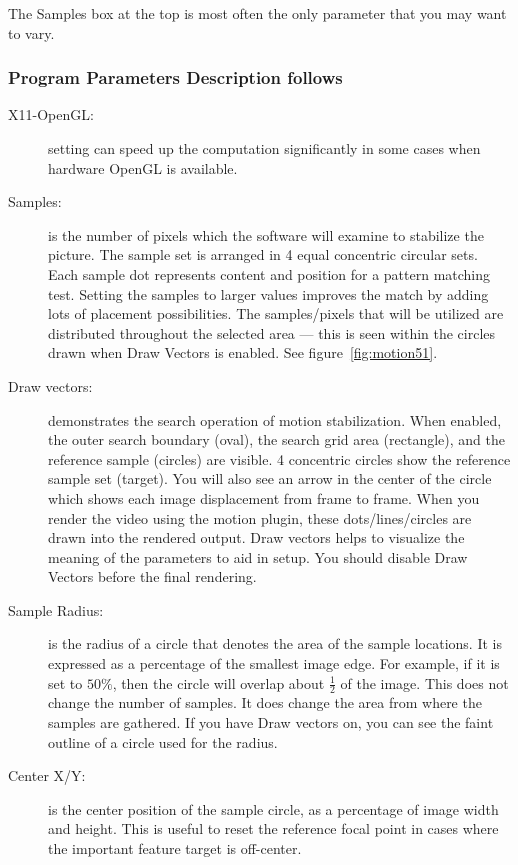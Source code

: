 The Samples box at the top is most often the only parameter that you may want to vary.

\subsubsection*{Program Parameters Description follows}
\label{ssub:program_parameters_description}

\begin{description}
    \item[X11-OpenGL:] setting can speed up the computation significantly in some cases when hardware OpenGL is available.
    \item[Samples:] is the number of pixels which the software will examine to stabilize the picture. The sample set is arranged in 4 equal concentric circular sets. Each sample dot represents content and position for a pattern matching test. Setting the samples to larger values improves the match by adding lots of placement possibilities. The samples/pixels that will be utilized are distributed throughout the selected area --- this is seen within the circles drawn when Draw Vectors is enabled. See figure~\ref{fig:motion51}.
    \item[Draw vectors:] demonstrates the search operation of motion stabilization. When enabled, the outer search boundary (oval), the search grid area (rectangle), and the reference sample (circles) are visible. 4 concentric circles show the reference sample set (target). You will also see an arrow in the center of the circle which shows each image displacement from frame to frame. When you render the video using the motion plugin, these dots/lines/circles are drawn into the rendered output. Draw vectors helps to visualize the meaning of the parameters to aid in setup. You should disable Draw Vectors before the final rendering.
    \item[Sample Radius:] is the radius of a circle that denotes the area of the sample locations. It is expressed as a percentage of the smallest image edge. For example, if it is set to $50\%$, then the circle will overlap about $\frac{1}{2}$ of the image. This does not change the number of samples. It does change the area from where the samples are gathered. If you have Draw vectors on, you can see the faint outline of a circle used for the radius.
    \item[Center X/Y:] is the center position of the sample circle, as a percentage of image width and height.
    This is useful to reset the reference focal point in cases where the important feature target is off-center.

\end{description}
